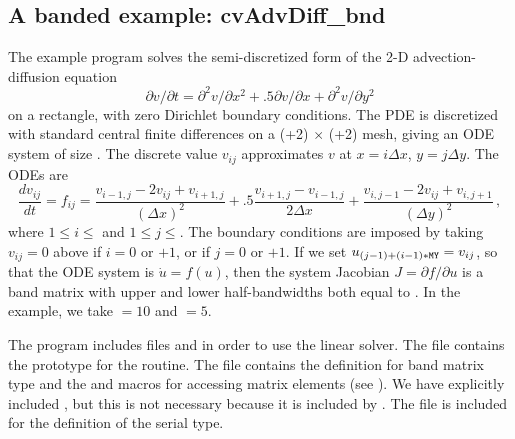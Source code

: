 

\subsection{A banded example: cvAdvDiff\_bnd}\label{ss:cvAdvDiff}

The example program  solves the semi-discretized form of
the 2-D advection-diffusion equation
\vspace*{-.1in}
\begin{equation}
\label{eq:adeqn}
\partial v / \partial t = \partial^2 v / \partial x^2
  + .5 \partial v / \partial x + \partial^2 v / \partial y^2
\end{equation}
on a rectangle, with zero Dirichlet boundary conditions. The PDE is 
discretized with standard central finite differences on a 
(+2) $\times$ (+2) mesh, giving an ODE system of size
.  The discrete value $v_{ij}$ approximates $v$ at $x = i \Delta x$,
$y = j \Delta y$. The ODEs are
\begin{equation}
\label{eq:cdiff}
\frac{dv_{ij}}{dt} = f_{ij} =
         \frac{v_{i-1,j} - 2 v_{ij} + v_{i+1,j}}{(\Delta x)^2}
       + .5  \frac{v_{i+1,j} - v_{i-1,j}}{2 \Delta x}
       + \frac{v_{i,j-1} - 2 v_{ij} + v_{i,j+1}}{(\Delta y)^2} \, ,
\end{equation}
where $1 \leq i \leq $ and $1 \leq j \leq $.  The boundary
conditions are imposed by taking $v_{ij} = 0$ above if $i = 0$
or $ + 1$, or if $j = 0$ or $ + 1$. 
If we set $u_{(j-1)+(i-1)*{\tt MY}} = v_{ij}$, so that the ODE system is
$\dot{u} = f(u)$, then the system Jacobian $J = \partial f / \partial u$ is
a band matrix with upper and lower half-bandwidths both equal to .
In the example, we take  $= 10$ and  $= 5$.

The  program includes files  and
 in order to use the {\cvband} linear solver. The 
file contains the prototype for the  routine. The 
file contains the definition for band matrix type  and the
 and  macros for accessing matrix
elements (see ).
We have explicitly included , but this is not necessary because
it is included by .  The file  is
included for the definition of the serial  type.

